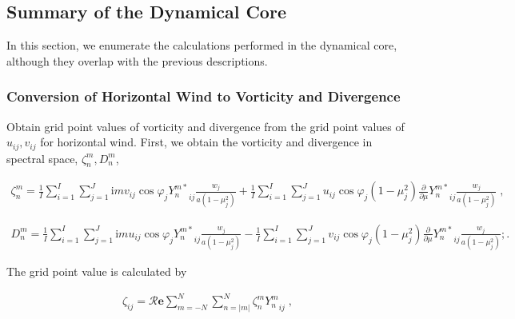 \hypertarget{summary-of-the-dynamical-core}{%
\subsection{Summary of the Dynamical Core}\label{summary-of-the-dynamical-core}}

In this section, we enumerate the calculations performed in the dynamical core, although they overlap with the previous descriptions.

\hypertarget{conversion-of-horizontal-wind-to-vorticity-and-divergence}{%
\subsubsection{Conversion of Horizontal Wind to Vorticity and Divergence}\label{conversion-of-horizontal-wind-to-vorticity-and-divergence}}

Obtain grid point values of vorticity and divergence from the grid point values of \(u_{ij}, v_{ij}\) for horizontal wind. First, we obtain the vorticity and divergence in spectral space,
\(\zeta_n^m, D_n^m\),

\begin{eqnarray}
\zeta_n^m  =  \frac{1}{I} \sum_{i=1}^{I} \sum_{j=1}^{J}  
                  \mathrm{i}m v_{ij} \cos\varphi_j {Y_n^{m*}}_{ij}
                \frac{w_j}{a(1-\mu_j^{2})}
           +    \frac{1}{I} \sum_{i=1}^{I} \sum_{j=1}^{J}  
                     u_{ij} \cos\varphi_j (1-\mu_j^2)
                  \frac{\partial }{\partial \mu} {Y_n^{m*}}_{ij}
                 \frac{w_j}{a(1-\mu_j^{2})} \; ,
\end{eqnarray}

\begin{eqnarray}
    D_n^m  =  \frac{1}{I} \sum_{i=1}^{I} \sum_{j=1}^{J}  
                  \mathrm{i}m u_{ij} \cos\varphi_j {Y_n^{m*}}_{ij}
                \frac{w_j}{a(1-\mu_j^{2})}
           -    \frac{1}{I} \sum_{i=1}^{I} \sum_{j=1}^{J}  
                  v_{ij} \cos\varphi_j  (1-\mu_j^2)
                  \frac{\partial }{\partial \mu} {Y_n^{m*}}_{ij}
                 \frac{w_j}{a(1-\mu_j^{2})} ; .
\end{eqnarray}

The grid point value is calculated by

\begin{eqnarray}
  \zeta_{ij}
   =  {\mathcal R}{\mathbf{e}} \sum_{m=-N}^{N} \sum_{n=|m|}^{N}
      \zeta_n^m  {Y_n^m}_{ij} \; ,
\end{eqnarray}

